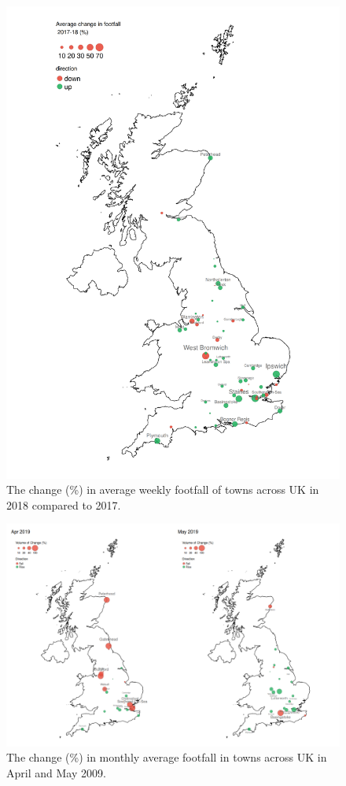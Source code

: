 \cleartoleftpage
\begin{figure}
  \forceversofloat
  \includegraphics[trim={0 0 0 0},clip]{images/applications-cities-rank.png}
  \caption{The change (\%) in average weekly footfall of towns across UK in 2018 compared to 2017.}
  \label{figure:applications:cities:change}
\end{figure}

\begin{figure}
  \forcerectofloat
  \includegraphics[trim={0 12 0 0},clip]{images/applications-city-indices.png}
  \caption{The change (\%) in monthly average footfall in towns across UK in April and May 2009.}
  \label{figure:applications:cities:month}
\end{figure}

